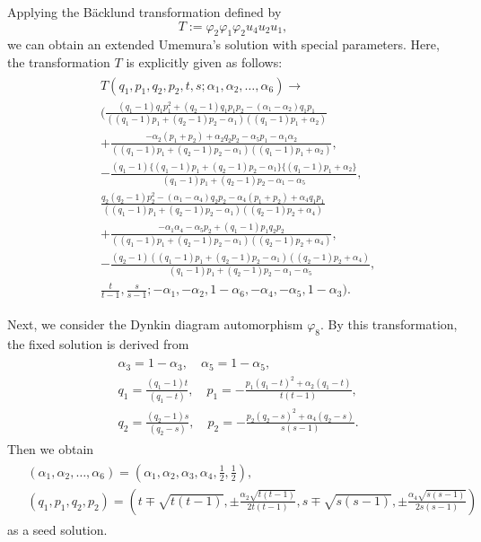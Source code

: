 Applying the B{\"a}cklund transformation defined by
\begin{equation}
T:=\varphi_2\varphi_1\varphi_2u_4u_2u_1,
\end{equation}
we can obtain an extended Umemura's solution with special parameters. Here, the transformation $T$ is explicitly given as follows:
\begin{align}
\begin{split}
&T(q_1,p_1,q_2,p_2,t,s;\alpha_1,\alpha_2,\dots,\alpha_6) \rightarrow\\
&(\frac{(q_1-1)q_1p_1^2+(q_2-1)q_1p_1p_2-(\alpha_1-\alpha_2)q_1p_1}{((q_1-1)p_1+(q_2-1)p_2-\alpha_1)((q_1-1)p_1+\alpha_2)}\\
&+\frac{-\alpha_2(p_1+p_2)+\alpha_2q_2p_2-\alpha_5p_1-\alpha_1\alpha_2}{((q_1-1)p_1+(q_2-1)p_2-\alpha_1)((q_1-1)p_1+\alpha_2)},\\
&-\frac{(q_1-1)\{(q_1-1)p_1+(q_2-1)p_2-\alpha_1\}\{(q_1-1)p_1+\alpha_2\}}{(q_1-1)p_1+(q_2-1)p_2-\alpha_1-\alpha_5},\\
&\frac{q_2(q_2-1)p_2^2-(\alpha_1-\alpha_4)q_2p_2-\alpha_4(p_1+p_2)+\alpha_4q_1p_1}{((q_1-1)p_1+(q_2-1)p_2-\alpha_1)((q_2-1)p_2+\alpha_4)}\\
&+\frac{-\alpha_1\alpha_4-\alpha_5p_2+(q_1-1)p_1q_2p_2}{((q_1-1)p_1+(q_2-1)p_2-\alpha_1)((q_2-1)p_2+\alpha_4)},\\
&-\frac{(q_2-1)((q_1-1)p_1+(q_2-1)p_2-\alpha_1)((q_2-1)p_2+\alpha_4)}{(q_1-1)p_1+(q_2-1)p_2-\alpha_1-\alpha_5},\\
&\frac{t}{t-1},\frac{s}{s-1};-\alpha_1,-\alpha_2,1-\alpha_6,-\alpha_4,-\alpha_5,1-\alpha_3).
\end{split}
\end{align}



Next, we consider the Dynkin diagram automorphism $\varphi_8$. By this transformation, the fixed solution is derived from
\begin{align}
\begin{split}
&\alpha_3=1-\alpha_3, \quad \alpha_5=1-\alpha_5,\\
&q_1=\frac{(q_1-1)t}{(q_1-t)}, \quad p_1=-\frac{p_1(q_1-t)^2+\alpha_2(q_1-t)}{t(t-1)},\\
&q_2=\frac{(q_2-1)s}{(q_2-s)}, \quad p_2=-\frac{p_2(q_2-s)^2+\alpha_4(q_2-s)}{s(s-1)}.
\end{split}
\end{align}
Then we obtain
\begin{align}
\begin{split}
&(\alpha_1,\alpha_2,\dots,\alpha_6)=\left(\alpha_1,\alpha_2,\alpha_3,\alpha_4,\frac{1}{2},\frac{1}{2}\right),\\
&(q_1,p_1,q_2,p_2)=\left(t\mp\sqrt{t(t-1)},\pm\frac{\alpha_2\sqrt{t(t-1)}}{2t(t-1)},s\mp\sqrt{s(s-1)},\pm\frac{\alpha_4\sqrt{s(s-1)}}{2s(s-1)}\right)
\end{split}
\end{align}
as a seed solution.









